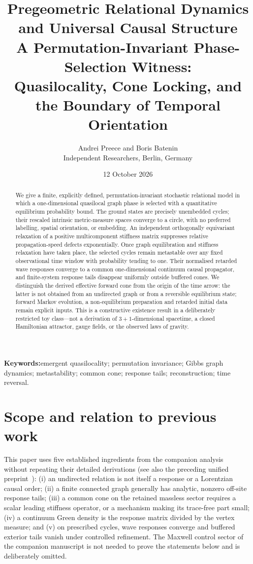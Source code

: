 \documentclass[11pt,a4paper]{article}
\title{\bfseries\Large Pregeometric Relational Dynamics and Universal Causal Structure\\[0.55em]
\normalfont\large A Permutation-Invariant Phase-Selection Witness:\\
Quasilocality, Cone Locking, and the Boundary of Temporal Orientation}
\author{Andrei Preece \quad and \quad Boris Batenin\\[0.45em]
\normalsize Independent Researchers, Berlin, Germany}
\date{12 October 2026}
\numberwithin{equation}{section}
\newcommand{\1}{\mathbf{1}}
\begin{document}
\maketitle
\vspace{-1.7em}
\begin{abstract}
\noindent
We give a finite, explicitly defined, permutation-invariant stochastic relational model in which a one-dimensional quasilocal graph phase is selected with a quantitative equilibrium probability bound. The ground states are precisely unembedded cycles; their rescaled intrinsic metric-measure spaces converge to a circle, with no preferred labelling, spatial orientation, or embedding. An independent orthogonally equivariant relaxation of a positive multicomponent stiffness matrix suppresses relative propagation-speed defects exponentially. Once graph equilibration and stiffness relaxation have taken place, the selected cycles remain metastable over any fixed observational time window with probability tending to one. Their normalised retarded wave responses converge to a common one-dimensional continuum causal propagator, and finite-system response tails disappear uniformly outside buffered cones. We distinguish the derived effective forward cone from the origin of the time arrow: the latter is not obtained from an undirected graph or from a reversible equilibrium state; forward Markov evolution, a non-equilibrium preparation and retarded initial data remain explicit inputs. This is a constructive existence result in a deliberately restricted toy class---not a derivation of $3+1$-dimensional spacetime, a closed Hamiltonian attractor, gauge fields, or the observed laws of gravity.
\end{abstract}
\noindent\textbf{Keywords:}\enspace emergent quasilocality; permutation invariance; Gibbs graph dynamics; metastability; common cone; response tails; reconstruction; time reversal.

\section{Scope and relation to previous work}
This paper uses five established ingredients from the companion analysis~\cite{companion} without repeating their detailed derivations (see also the preceding unified preprint~\cite{original}): (i) an undirected relation is not itself a response or a Lorentzian causal order; (ii) a finite connected graph generally has analytic, nonzero off-site response tails; (iii) a common cone on the retained massless sector requires a scalar leading stiffness operator, or a mechanism making its trace-free part small; (iv) a continuum Green density is the response matrix divided by the vertex measure; and (v) on prescribed cycles, wave responses converge and buffered exterior tails vanish under controlled refinement. The Maxwell control sector of the companion manuscript is not needed to prove the statements below and is deliberately omitted.
\end{document}
